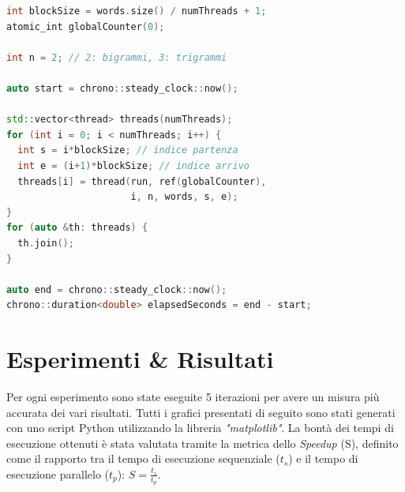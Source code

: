 \documentclass[10pt,twocolumn,letterpaper]{article}
\begin{document}
\begin{lstlisting}[basicstyle=\scriptsize, language=C++, frame=single, caption={Lancio di C++ Thread per la ricerca di bigrammi/trigrammi},captionpos=b,showstringspaces=false]
int blockSize = words.size() / numThreads + 1;
atomic_int globalCounter(0);

int n = 2; // 2: bigrammi, 3: trigrammi

auto start = chrono::steady_clock::now();

std::vector<thread> threads(numThreads);
for (int i = 0; i < numThreads; i++) {
  int s = i*blockSize; // indice partenza
  int e = (i+1)*blockSize; // indice arrivo
  threads[i] = thread(run, ref(globalCounter), 
                      i, n, words, s, e);
}
for (auto &th: threads) {
  th.join();
}

auto end = chrono::steady_clock::now();
chrono::duration<double> elapsedSeconds = end - start;
\end{lstlisting}

\section{Esperimenti \& Risultati}
Per ogni esperimento sono state eseguite 5 iterazioni per avere un misura più accurata dei vari risultati.\newline
Tutti i grafici presentati di seguito sono stati generati con uno script Python utilizzando la libreria \textit{"matplotlib"}.\newline
La bontà dei tempi di esecuzione ottenuti è stata valutata tramite la metrica dello \textit{Speedup} (S), definito come il rapporto tra il tempo di esecuzione sequenziale ($t_s$) e il tempo di esecuzione parallelo ($t_p$): $S = \frac{t_s}{t_p}$.
\end{document}
